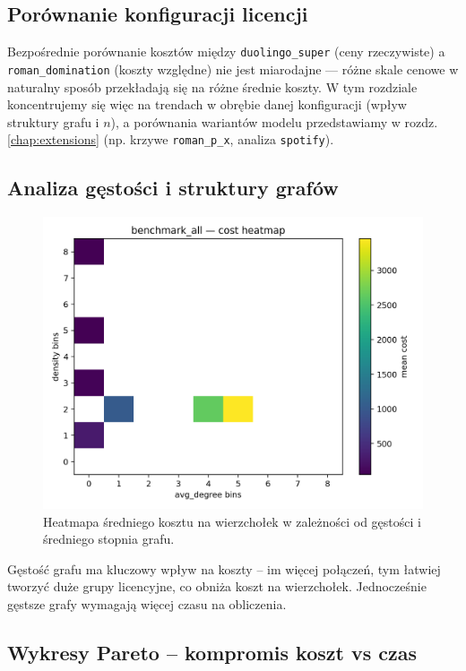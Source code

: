 \subsection{Porównanie konfiguracji licencji}

Bezpośrednie porównanie kosztów między \texttt{duolingo\_super} (ceny rzeczywiste) a \texttt{roman\_domination} (koszty względne) nie jest miarodajne — różne skale cenowe w naturalny sposób przekładają się na różne średnie koszty. W tym rozdziale koncentrujemy się więc na trendach w obrębie danej konfiguracji (wpływ struktury grafu i \(n\)), a porównania wariantów modelu przedstawiamy w rozdz.\,\ref{chap:extensions} (np. krzywe \texttt{roman\_p\_x}, analiza \texttt{spotify}).

\subsection{Analiza gęstości i struktury grafów}

\begin{figure}[H]
  \centering
  \includegraphics[width=0.7\linewidth]{assets/figures/ba_heatmap_cost.png}
  \caption{Heatmapa średniego kosztu na wierzchołek w zależności od gęstości i średniego stopnia grafu.}
  \label{fig:density_heatmap}
\end{figure}


Gęstość grafu ma kluczowy wpływ na koszty -- im więcej połączeń, tym łatwiej tworzyć duże grupy licencyjne, co obniża koszt na wierzchołek. Jednocześnie gęstsze grafy wymagają więcej czasu na obliczenia.

\subsection{Wykresy Pareto -- kompromis koszt vs czas}

